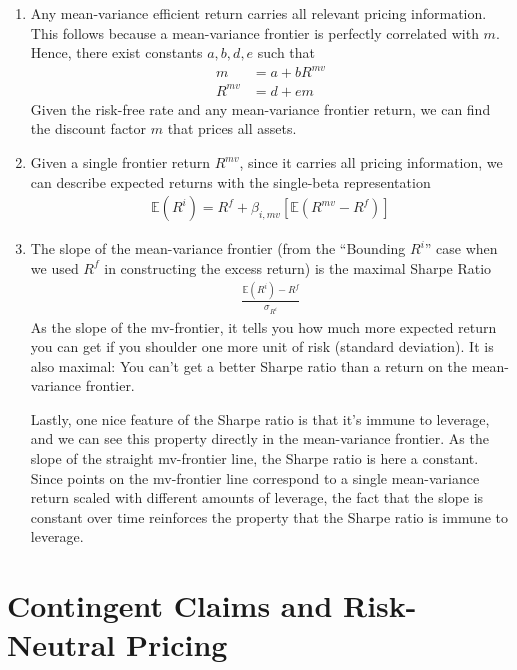 \documentclass[12pt]{article}
\theoremstyle{plain}
\theoremstyle{definition}
\theoremstyle{remark}
\begin{document}
\begin{enumerate}
  \item Any mean-variance efficient return carries all relevant pricing
    information. This follows because a mean-variance frontier is
    perfectly correlated with $m$. Hence, there exist constants
    $a,b,d,e$ such that
    \begin{align*}
      m &= a + b R^{mv} \\
      R^{mv} &= d + e m
    \end{align*}
    Given the risk-free rate and any mean-variance frontier return, we
    can find the discount factor $m$ that prices all assets.

  \item Given a single frontier return $R^{mv}$, since it carries all
    pricing information, we can describe expected returns with the
    single-beta representation
    \begin{align*}
      \mathbb{E}(R^i) = R^f + \beta_{i,mv} [\mathbb{E}(R^{mv}-R^f)]
    \end{align*}

  \item The slope of the mean-variance frontier (from the ``Bounding
    $R^i$'' case when we used $R^f$ in constructing the excess return)
    is the maximal Sharpe Ratio
    \begin{align*}
      \frac{\mathbb{E}(R^i) - R^f}{\sigma_{R^i}}
    \end{align*}
    As the slope of the mv-frontier, it tells you how much more expected
    return you can get if you shoulder one more unit of risk (standard
    deviation). It is also maximal: You can't get a better Sharpe ratio
    than a return on the mean-variance frontier.

    Lastly, one nice feature of the Sharpe ratio is that it's immune to
    leverage, and we can see this property directly in the mean-variance
    frontier. As the slope of the straight mv-frontier line, the Sharpe
    ratio is here a constant. Since points on the mv-frontier line
    correspond to a single mean-variance return scaled with different
    amounts of leverage, the fact that the slope is constant over time
    reinforces the property that the Sharpe ratio is immune to leverage.

\end{enumerate}

\clearpage
\section{Contingent Claims and Risk-Neutral Pricing}
\end{document}
